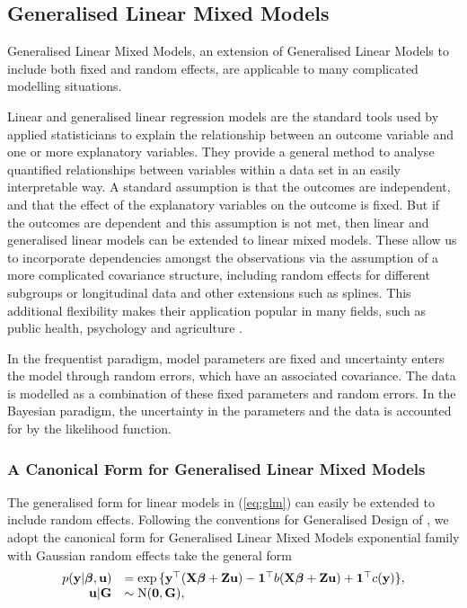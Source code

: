 \subsection{Generalised Linear Mixed Models}

Generalised Linear Mixed Models, an extension of Generalised Linear Models to
include both fixed and random effects, are applicable to many complicated
modelling situations.

Linear and generalised linear regression models are the standard tools used by
applied statisticians to explain the relationship between an outcome variable
and one or more explanatory variables. They provide a general method  to analyse
quantified relationships between variables within a data set in an easily
interpretable way. A standard assumption is that the outcomes are independent,
and that the effect of the explanatory variables on the outcome is fixed. But if
the outcomes are dependent and this assumption is not met, then linear and
generalised linear models can be extended to linear mixed models. These allow us
to incorporate dependencies amongst the  observations via the assumption of a
more complicated covariance structure, including random effects for  different
subgroups or longitudinal data and other extensions such as splines. This
additional flexibility makes their application popular in many fields, such as
public health, psychology and agriculture \citep{Kleinman2004, Lo2015, Kachman2000}.

In the frequentist paradigm, model parameters are fixed and uncertainty enters
the model through random errors, which have an associated covariance. The data
is modelled as a combination of these fixed parameters and random errors. In
the Bayesian paradigm, the uncertainty in the parameters and the data is
accounted for by the likelihood function.

\subsubsection{A Canonical Form for Generalised Linear Mixed Models}

The generalised form for linear models in  (\ref{eq:glm}) can easily be
extended to include random effects.  Following the conventions for Generalised
Design of \cite{Zhao2006}, we adopt the canonical form for Generalised Linear
Mixed Models exponential family with Gaussian random effects take the general
form
$$
\begin{array}{rl}\label{eq:glmm}
	p({\bf y} | {\boldsymbol \beta}, {\bf u}) &= \exp{\{ {\bf y}^\top ({\bf X}{\boldsymbol\beta}+ {\bf Z}{\bf u}) - {\bf1}^\top b({\bf X}{\boldsymbol\beta}+ {\bf Z}{\bf u}) + {\bf1}^\top c({\bf y}) \}}, \\
	{\bf u} | {\bf G} &\sim \text{N}({\bf 0}, {\bf G}),
\end{array}
$$


